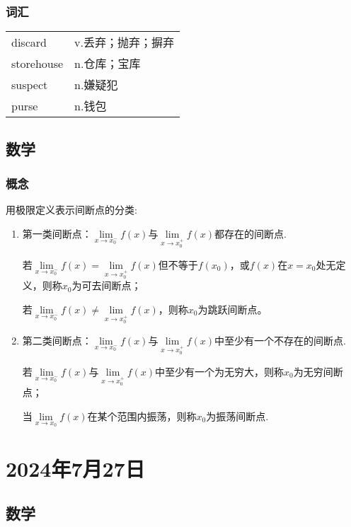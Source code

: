 \documentclass[UTF8]{ctexart}
\begin{document}
\subsubsection{词汇}
\begin{table}[h]
      \centering
      \begin{tabular}{p{}p{}}
            discard    & v.丢弃；抛弃；摒弃 \\
            storehouse & n.仓库；宝库    \\
            suspect    & n.嫌疑犯      \\
            purse      & n.钱包       \\
      \end{tabular}
\end{table}

\subsection{数学}
\subsubsection{概念}
用极限定义表示间断点的分类:
\begin{enumerate}
      \item 第一类间断点：$\lim\limits_{x \to x^{-}_{0}}f(x)$与$\lim\limits_{x \to x^{+}_{0}}f(x)$都存在的间断点.

            若$\lim\limits_{x \to x^{-}_{0}}f(x)=\lim\limits_{x \to x^{+}_{0}}f(x)$但不等于$f(x_0)$，或$f(x)$在$x=x_0$处无定义，则称$x_0$为可去间断点；

            若$\lim\limits_{x \to x^{-}_{0}}f(x)\ne\lim\limits_{x \to x^{+}_{0}}f(x)$，则称$x_0$为跳跃间断点。
      \item 第二类间断点：$\lim\limits_{x \to x^{-}_{0}}f(x)$与$\lim\limits_{x \to x^{+}_{0}}f(x)$中至少有一个不存在的间断点.

            若$\lim\limits_{x \to x^{-}_{0}}f(x)$与$\lim\limits_{x \to x^{+}_{0}}f(x)$中至少有一个为无穷大，则称$x_0$为无穷间断点；

            当$\lim\limits_{x \to x_{0}}f(x)$在某个范围内振荡，则称$x_0$为振荡间断点.

\end{enumerate}
\section{2024年7月27日}
\subsection{数学}
\end{document}
